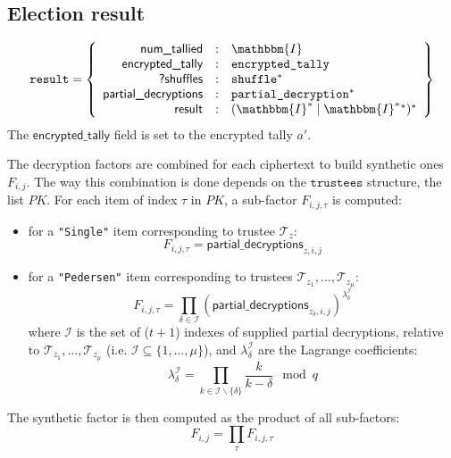 \documentclass[a4paper]{article}
\newcommand{\I}{\mathbbm{I}}
\newcommand{\etally}{\texttt{encrypted\_tally}}
\newcommand{\pdecryption}{\texttt{partial\_decryption}}
\newcommand{\result}{\texttt{result}}
\begin{document}
\subsection{Election result}
\label{election-result}

\newcommand{\ntallied}{\textsf{num\_tallied}}
\newcommand{\etallylabel}{\textsf{encrypted\_tally}}
\newcommand{\pdlabel}{\textsf{partial\_decryptions}}
\newcommand{\resultlabel}{\textsf{result}}

\begin{gather*}
  \result=\left\{
    \begin{array}{rcl}
      \ntallied&:&\I\\
      \etallylabel&:&\etally\\
      \textsf{?shuffles}&:&\texttt{shuffle}^\ast\\
      \pdlabel&:&\pdecryption^\ast\\
      \resultlabel&:&(\I^\ast\mid\I^\ast{}^\ast)^\ast
    \end{array}
  \right\}
\end{gather*}
The $\etallylabel$ field is set to the encrypted tally $a'$.

The decryption factors are combined for each ciphertext to build
synthetic ones $F_{i,j}$. The way this combination is done depends on
the $\texttt{trustees}$ structure, the list $PK$. For each item of
index $\tau$ in $PK$, a sub-factor $F_{i,j,\tau}$ is computed:
\begin{itemize}
\item for a \texttt{"Single"} item corresponding to trustee
  $\mathcal{T}_z$:
  \[
    F_{i,j,\tau}=\pdlabel_{z,i,j}
  \]
\item for a \texttt{"Pedersen"} item corresponding to trustees
  $\mathcal{T}_{z_1},\dots,\mathcal{T}_{z_\mu}$:
  \[
    F_{i,j,\tau}=\prod_{\delta\in\mathcal{I}}(\pdlabel_{z_\delta,i,j})^{\lambda_\delta^{\mathcal{I}}}
  \]
  where $\mathcal{I}$ is the set of ($t+1$) indexes of supplied
  partial decryptions, relative to
  $\mathcal{T}_{z_1},\dots,\mathcal{T}_{z_\mu}$ (i.e. $\mathcal{I}\subseteq\{1,\dots,\mu\}$), and
  $\lambda_\delta^{\mathcal{I}}$ are the Lagrange coefficients:
  \[
    \lambda_\delta^{\mathcal{I}}=\prod_{k\in\mathcal{I}\backslash\{\delta\}}\frac{k}{k-\delta}\mod q
  \]
\end{itemize}
The synthetic factor is then computed as the product of all sub-factors:
\[
  F_{i,j}=\prod_\tau F_{i,j,\tau}
\]
\end{document}
